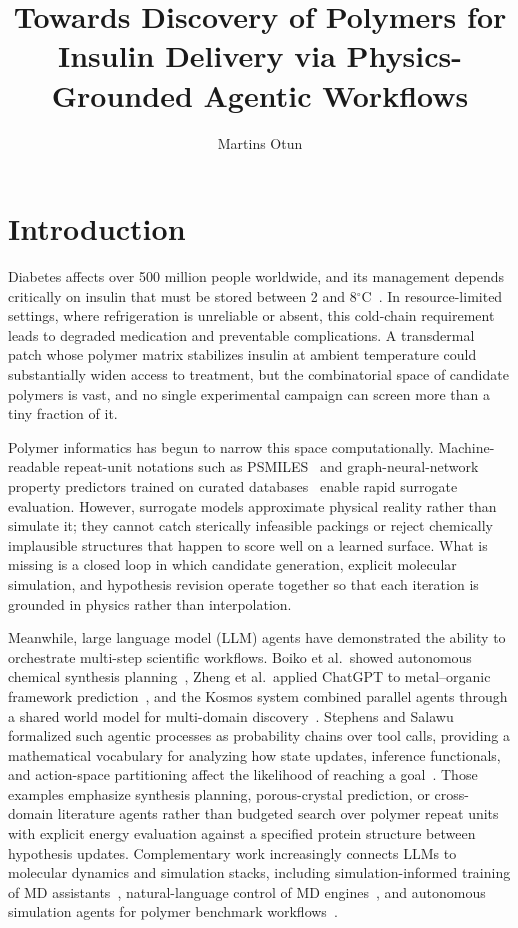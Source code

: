 \documentclass[twocolumn]{fairmeta}
\title{Towards Discovery of Polymers for Insulin Delivery via Physics-Grounded Agentic Workflows}
\author[1]{Martins Otun}
\affiliation[1]{Algonix AI Ltd., Scotland, United Kingdom}
\begin{document}
\maketitle

\section{Introduction}

Diabetes affects over 500 million people worldwide, and its management depends critically on insulin that must be stored between 2 and 8$^{\circ}$C~\cite{hsu2022glycosylated}.
In resource-limited settings, where refrigeration is unreliable or absent, this cold-chain requirement leads to degraded medication and preventable complications.
A transdermal patch whose polymer matrix stabilizes insulin at ambient temperature could substantially widen access to treatment, but the combinatorial space of candidate polymers is vast, and no single experimental campaign can screen more than a tiny fraction of it.

Polymer informatics has begun to narrow this space computationally.
Machine-readable repeat-unit notations such as PSMILES~\cite{lin2019bigsmiles,kuenneth2023polybert} and graph-neural-network property predictors trained on curated databases~\cite{huan2020polymer,kern2022solvent,gurnani2024ai} enable rapid surrogate evaluation.
However, surrogate models approximate physical reality rather than simulate it; they cannot catch sterically infeasible packings or reject chemically implausible structures that happen to score well on a learned surface.
What is missing is a closed loop in which candidate generation, explicit molecular simulation, and hypothesis revision operate together so that each iteration is grounded in physics rather than interpolation.

Meanwhile, large language model (LLM) agents have demonstrated the ability to orchestrate multi-step scientific workflows.
Boiko et al.\ showed autonomous chemical synthesis planning~\cite{boiko2023autonomous}, Zheng et al.\ applied ChatGPT to metal--organic framework prediction~\cite{zheng2023chatgpt}, and the Kosmos system combined parallel agents through a shared world model for multi-domain discovery~\cite{kosmos2025}.
Stephens and Salawu formalized such agentic processes as probability chains over tool calls, providing a mathematical vocabulary for analyzing how state updates, inference functionals, and action-space partitioning affect the likelihood of reaching a goal~\cite{stephens2025mathframing}.
Those examples emphasize synthesis planning, porous-crystal prediction, or cross-domain literature agents rather than budgeted search over polymer repeat units with explicit energy evaluation against a specified protein structure between hypothesis updates.
Complementary work increasingly connects LLMs to molecular dynamics and simulation stacks, including simulation-informed training of MD assistants~\cite{mdagent2_2026}, natural-language control of MD engines~\cite{simulon2026}, and autonomous simulation agents for polymer benchmark workflows~\cite{liu2024asa}.
\end{document}
